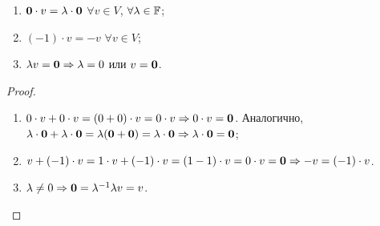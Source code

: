 \begin{proposal}
    \begin{enumerate}[nolistsep]
        \item $\boldsymbol{0} \cdot v = \lambda \cdot \boldsymbol{0}$ $\forall v \in V$, $\forall \lambda \in \mathbb{F}$;
        \item $(-1) \cdot v = -v$ $\forall v \in V$;
        \item $\lambda v = \boldsymbol{0} \Rightarrow \lambda = 0$ или $v = \boldsymbol{0}$.
    \end{enumerate}
\end{proposal}

\begin{proof}
    \begin{enumerate}[nolistsep]
        \item $0 \cdot v + 0 \cdot v = (0 + 0) \cdot v = 0 \cdot v \Rightarrow 0 \cdot v = \boldsymbol{0}$. Аналогично, $\lambda \cdot \boldsymbol{0} + \lambda \cdot \boldsymbol{0} = \lambda(\boldsymbol{0} + \boldsymbol{0}) = \lambda \cdot \boldsymbol{0} \Rightarrow \lambda \cdot \boldsymbol{0} = \boldsymbol{0}$;
        \item $v + (-1) \cdot v = 1 \cdot v + (-1) \cdot v = (1 - 1) \cdot v = 0 \cdot v = \boldsymbol{0} \Rightarrow -v = (-1) \cdot v$.
        \item $\lambda \ne 0 \Rightarrow \boldsymbol{0} = \lambda^{-1}\lambda v = v$.
    \end{enumerate}
\end{proof}

